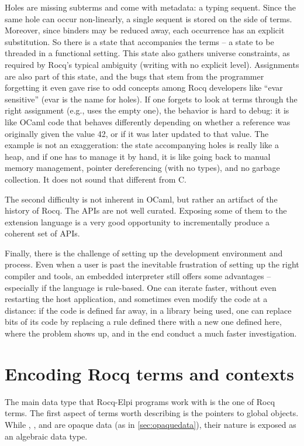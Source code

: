 \documentclass[a4paper, 11pt]{book}
\begin{document}
Holes are missing subterms and come with metadata: a typing sequent. Since the
same hole can occur non-linearly, a single sequent is stored on the side of
terms. Moreover, since binders may be reduced away, each occurrence has an
explicit substitution. So there is a state that accompanies the terms -- a state
to be threaded in a functional setting. This state also gathers universe
constraints, as required by Rocq's typical ambiguity (writing  with
no explicit level).
Assignments are also part of this state, and the bugs that stem from the
programmer forgetting it even gave rise to odd concepts among Rocq developers
like ``evar sensitive'' (evar is the name for holes). If one forgets to look at
terms through the right assignment (e.g., uses the empty one), the behavior is
hard to debug: it is like OCaml code that behaves differently depending on
whether a reference  was originally given the value 42, or if it was
later updated to that value.
The example is not an exaggeration: the state accompanying holes is really like
a heap, and if one has to manage it by hand, it is like going back to manual
memory management, pointer dereferencing (with no types), and no garbage
collection. It does not sound that different from C.

The second difficulty is not inherent in OCaml, but rather an artifact of the
history of Rocq. The APIs are not well curated. Exposing some of them to the
extension language is a very good opportunity to incrementally produce a
coherent set of APIs.

Finally, there is the challenge of setting up the development environment and
process. Even when a user is past the inevitable frustration of setting up the
right compiler and tools, an embedded interpreter still offers some
advantages -- especially if the language is rule-based. One can iterate faster,
without even restarting the host application, and sometimes even modify the
code at a distance: if the code is defined far away, in a library being used,
one can replace bits of its code by replacing a rule defined there with a
new one defined here, where the problem shows up, and in the end conduct a
much faster investigation.

\section{Encoding Rocq terms and contexts}\label{GALLINA}


The main data type that Rocq-Elpi programs work with is the one of Rocq terms. The
first aspect of terms worth describing is the pointers to global objects.
While , , and  are opaque
data (as in \cref{sec:opaquedata}), their nature is exposed as an algebraic
data type.
\end{document}
